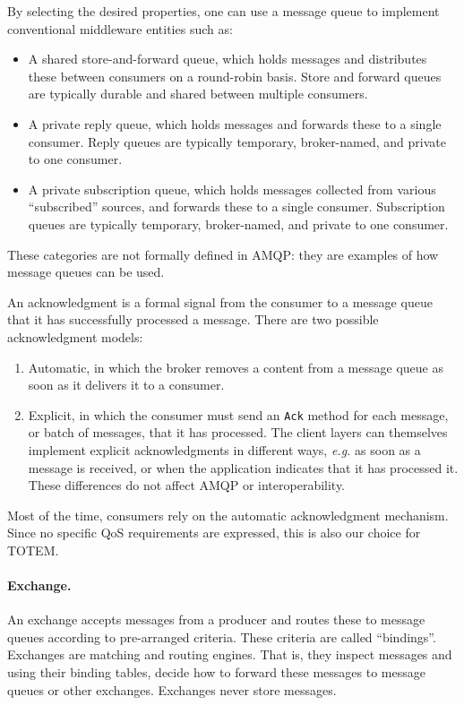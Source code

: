 By selecting the desired properties, one can use a message queue to
implement conventional middleware entities such as:
\begin{itemize}
\item A shared store-and-forward queue, which holds messages and
  distributes these between consumers on a round-robin basis. Store
  and forward queues are typically durable and shared between multiple
  consumers.
\item A private reply queue, which holds messages and forwards these
  to a single consumer. Reply queues are typically temporary,
  broker-named, and private to one consumer.
\item A private subscription queue, which holds messages collected
  from various ``subscribed'' sources, and forwards these to a single
  consumer. Subscription queues are typically temporary, broker-named,
  and private to one consumer.
\end{itemize}
These categories are not formally defined in AMQP: they are examples
of how message queues can be used.

An acknowledgment is a formal signal from the consumer to a message
queue that it has successfully processed a message. There are two
possible acknowledgment models:
\begin{enumerate}
\item Automatic, in which the broker removes a content from a message
  queue as soon as it delivers it to a consumer.
\item Explicit, in which the consumer must send an \texttt{Ack} method
  for each message, or batch of messages, that it has processed. The
  client layers can themselves implement explicit acknowledgments in
  different ways, \textit{e.g.} as soon as a message is received, or
  when the application indicates that it has processed it. These
  differences do not affect AMQP or interoperability.
\end{enumerate}
Most of the time, consumers rely on the automatic acknowledgment
mechanism. Since no specific QoS requirements are expressed, this is
also our choice for TOTEM.

\paragraph{Exchange.} An exchange accepts messages from a producer
and routes these to message queues according to pre-arranged
criteria. These criteria are called ``bindings''. Exchanges are matching
and routing engines. That is, they inspect messages and using their
binding tables, decide how to forward these messages to message queues
or other exchanges. Exchanges never store messages.

